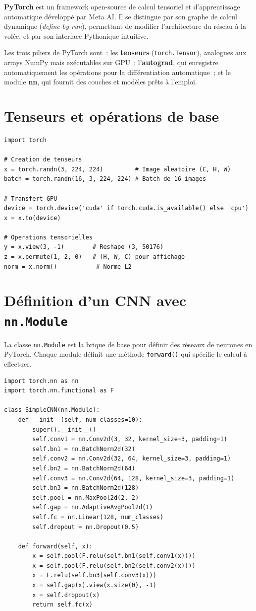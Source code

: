 \documentclass[a4paper,11pt,twoside]{book}
\begin{document}
\textbf{PyTorch} est un framework open-source de calcul tensoriel et d'apprentissage automatique développé par Meta AI. Il se distingue par son graphe de calcul dynamique (\textit{define-by-run}), permettant de modifier l'architecture du réseau à la volée, et par son interface Pythonique intuitive.

Les trois piliers de PyTorch sont~: les \textbf{tenseurs} (\texttt{torch.Tensor}), analogues aux arrays NumPy mais exécutables sur GPU~; l'\textbf{autograd}, qui enregistre automatiquement les opérations pour la différentiation automatique~; et le module \textbf{nn}, qui fournit des couches et modèles prêts à l'emploi.

\section{Tenseurs et opérations de base}

\begin{lstlisting}[caption={Opérations tensorielle de base en PyTorch}]
import torch

# Creation de tenseurs
x = torch.randn(3, 224, 224)         # Image aleatoire (C, H, W)
batch = torch.randn(16, 3, 224, 224) # Batch de 16 images

# Transfert GPU
device = torch.device('cuda' if torch.cuda.is_available() else 'cpu')
x = x.to(device)

# Operations tensorielles
y = x.view(3, -1)        # Reshape (3, 50176)
z = x.permute(1, 2, 0)   # (H, W, C) pour affichage
norm = x.norm()           # Norme L2
\end{lstlisting}

\section{Définition d'un CNN avec \texttt{nn.Module}}

La classe \texttt{nn.Module} est la brique de base pour définir des réseaux de neurones en PyTorch. Chaque module définit une méthode \texttt{forward()} qui spécifie le calcul à effectuer.

\begin{lstlisting}[caption={Définition d'un CNN simple}]
import torch.nn as nn
import torch.nn.functional as F

class SimpleCNN(nn.Module):
    def __init__(self, num_classes=10):
        super().__init__()
        self.conv1 = nn.Conv2d(3, 32, kernel_size=3, padding=1)
        self.bn1 = nn.BatchNorm2d(32)
        self.conv2 = nn.Conv2d(32, 64, kernel_size=3, padding=1)
        self.bn2 = nn.BatchNorm2d(64)
        self.conv3 = nn.Conv2d(64, 128, kernel_size=3, padding=1)
        self.bn3 = nn.BatchNorm2d(128)
        self.pool = nn.MaxPool2d(2, 2)
        self.gap = nn.AdaptiveAvgPool2d(1)
        self.fc = nn.Linear(128, num_classes)
        self.dropout = nn.Dropout(0.5)

    def forward(self, x):
        x = self.pool(F.relu(self.bn1(self.conv1(x))))
        x = self.pool(F.relu(self.bn2(self.conv2(x))))
        x = F.relu(self.bn3(self.conv3(x)))
        x = self.gap(x).view(x.size(0), -1)
        x = self.dropout(x)
        return self.fc(x)
\end{lstlisting}
\end{document}
